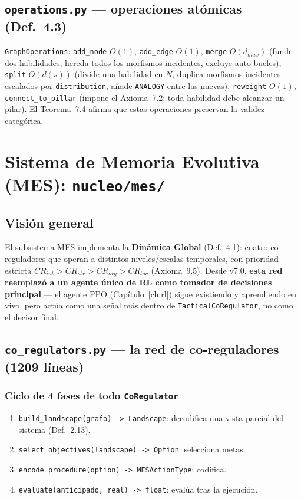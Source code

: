 \documentclass[11pt,a4paper]{report}
\newcommand{\code}[1]{\texttt{#1}}
\begin{document}
\section{\code{operations.py} --- operaciones at\'omicas (Def.~4.3)}

\code{GraphOperations}: \code{add_node} $O(1)$, \code{add_edge} $O(1)$, \code{merge} $O(d_{max})$ (funde dos habilidades, hereda todos los morfismos incidentes, excluye auto-bucles), \code{split} $O(d(s))$ (divide una habilidad en $N$, duplica morfismos incidentes escalados por \code{distribution}, a\~nade \code{ANALOGY} entre las nuevas), \code{reweight} $O(1)$, \code{connect_to_pillar} (impone el Axioma~7.2: toda habilidad debe alcanzar un pilar). El Teorema~7.4 afirma que estas operaciones preservan la validez categ\'orica.

\chapter{Sistema de Memoria Evolutiva (MES): \code{nucleo/mes/}}
\label{ch:mes}

\section{Visi\'on general}

El subsistema MES implementa la \textbf{Din\'amica Global} (Def.~4.1): cuatro co-reguladores que operan a distintos niveles/escalas temporales, con prioridad estricta $CR_{int} > CR_{str} > CR_{org} > CR_{tac}$ (Axioma~9.5). Desde v7.0, \textbf{esta red reemplaz\'o a un agente \'unico de RL como tomador de decisiones principal} --- el agente PPO (Cap\'itulo~\ref{ch:rl}) sigue existiendo y aprendiendo en vivo, pero act\'ua como una se\~nal m\'as dentro de \code{TacticalCoRegulator}, no como el decisor final.

\section{\code{co_regulators.py} --- la red de co-reguladores (1209 l\'ineas)}

\subsection{Ciclo de 4 fases de todo \code{CoRegulator}}
\begin{enumerate}
  \item \code{build_landscape(grafo) -> Landscape}: decodifica una vista parcial del sistema (Def.~2.13).
  \item \code{select_objectives(landscape) -> Option}: selecciona metas.
  \item \code{encode_procedure(option) -> MESActionType}: codifica.
  \item \code{evaluate(anticipado, real) -> float}: eval\'ua tras la ejecuci\'on.
\end{enumerate}
\end{document}
